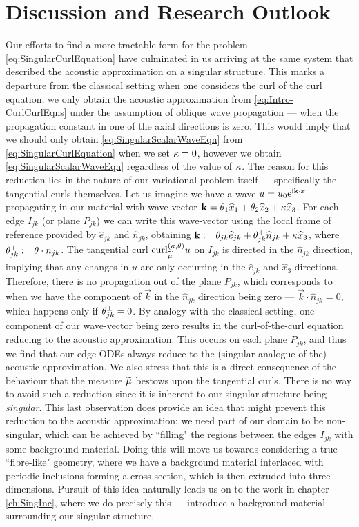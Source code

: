 \section{Discussion and Research Outlook} \label{sec:CC-Discussion}
Our efforts to find a more tractable form for the problem \eqref{eq:SingularCurlEquation} have culminated in us arriving at the same system that described the acoustic approximation on a singular structure.
This marks a departure from the classical setting when one considers the curl of the curl equation; we only obtain the acoustic approximation from \eqref{eq:Intro-CurlCurlEqns} under the assumption of oblique wave propagation --- when the propagation constant in one of the axial directions is zero.
This would imply that we should only obtain \eqref{eq:SingularScalarWaveEqn} from \eqref{eq:SingularCurlEquation} when we set $\kappa=0$, however we obtain \eqref{eq:SingularScalarWaveEqn} regardless of the value of $\kappa$.
The reason for this reduction lies in the nature of our variational problem itself --- specifically the tangential curls themselves.
Let us imagine we have a wave $u = u_0\mathrm{e}^{\mathrm{i}\mathbf{k}\cdot x}$ propagating in our material with wave-vector $\mathbf{k} = \theta_1\widehat{x}_1 + \theta_2\widehat{x}_2 + \kappa\widehat{x}_3$.
For each edge $I_{jk}$ (or plane $P_{jk}$) we can write this wave-vector using the local frame of reference provided by $\widehat{e}_{jk}$ and $\widehat{n}_{jk}$, obtaining $\mathbf{k} := \theta_{jk}\widehat{e}_{jk} + \theta_{jk}^\perp\widehat{n}_{jk} + \kappa\widehat{x}_3$, where $\theta_{jk}^\perp := \theta\cdot n_{jk}$.
The tangential curl $\mathrm{curl}_{\widetilde{\mu}}^{\left( \kappa, \theta \right)}u$ on $I_{jk}$ is directed in the $\widehat{n}_{jk}$ direction, implying that any changes in $u$ are only occurring in the $\widehat{e}_{jk}$ and $\widehat{x}_3$ directions.
Therefore, there is no propagation out of the plane $P_{jk}$, which corresponds to when we have the component of $\vec{k}$ in the $\widehat{n}_{jk}$ direction being zero --- $\vec{k}\cdot\widehat{n}_{jk}=0$, which happens only if $\theta_{jk}^\perp=0$.
By analogy with the classical setting, one component of our wave-vector being zero results in the curl-of-the-curl equation reducing to the acoustic approximation.
This occurs on each plane $P_{jk}$, and thus we find that our edge ODEs always reduce to the (singular analogue of the) acoustic approximation.
We also stress that this is a direct consequence of the behaviour that the measure $\widetilde{\mu}$ bestows upon the tangential curls.
There is no way to avoid such a reduction since it is inherent to our singular structure being \emph{singular}.
This last observation does provide an idea that might prevent this reduction to the acoustic approximation: we need part of our domain to be non-singular, which can be achieved by ``filling" the regions between the edges $I_{jk}$ with some background material.
Doing this will move us towards considering a true ``fibre-like" geometry, where we have a background material interlaced with periodic inclusions forming a cross section, which is then extruded into three dimensions.
Pursuit of this idea naturally leads us on to the work in chapter \ref{ch:SingInc}, where we do precisely this --- introduce a background material surrounding our singular structure.

